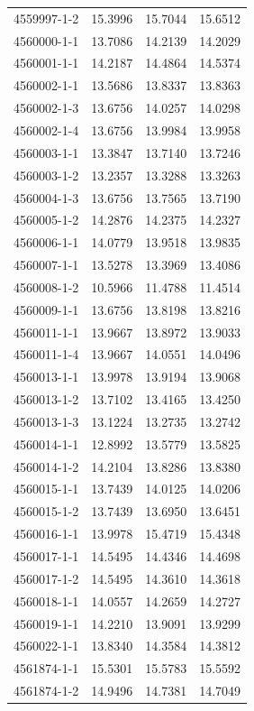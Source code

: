 \begin{longtable}{lrrr}
4559997-1-2 & 15.3996 & 15.7044 & 15.6512 \\
4560000-1-1 & 13.7086 & 14.2139 & 14.2029 \\
4560001-1-1 & 14.2187 & 14.4864 & 14.5374 \\
4560002-1-1 & 13.5686 & 13.8337 & 13.8363 \\
4560002-1-3 & 13.6756 & 14.0257 & 14.0298 \\
4560002-1-4 & 13.6756 & 13.9984 & 13.9958 \\
4560003-1-1 & 13.3847 & 13.7140 & 13.7246 \\
4560003-1-2 & 13.2357 & 13.3288 & 13.3263 \\
4560004-1-3 & 13.6756 & 13.7565 & 13.7190 \\
4560005-1-2 & 14.2876 & 14.2375 & 14.2327 \\
4560006-1-1 & 14.0779 & 13.9518 & 13.9835 \\
4560007-1-1 & 13.5278 & 13.3969 & 13.4086 \\
4560008-1-2 & 10.5966 & 11.4788 & 11.4514 \\
4560009-1-1 & 13.6756 & 13.8198 & 13.8216 \\
4560011-1-1 & 13.9667 & 13.8972 & 13.9033 \\
4560011-1-4 & 13.9667 & 14.0551 & 14.0496 \\
4560013-1-1 & 13.9978 & 13.9194 & 13.9068 \\
4560013-1-2 & 13.7102 & 13.4165 & 13.4250 \\
4560013-1-3 & 13.1224 & 13.2735 & 13.2742 \\
4560014-1-1 & 12.8992 & 13.5779 & 13.5825 \\
4560014-1-2 & 14.2104 & 13.8286 & 13.8380 \\
4560015-1-1 & 13.7439 & 14.0125 & 14.0206 \\
4560015-1-2 & 13.7439 & 13.6950 & 13.6451 \\
4560016-1-1 & 13.9978 & 15.4719 & 15.4348 \\
4560017-1-1 & 14.5495 & 14.4346 & 14.4698 \\
4560017-1-2 & 14.5495 & 14.3610 & 14.3618 \\
4560018-1-1 & 14.0557 & 14.2659 & 14.2727 \\
4560019-1-1 & 14.2210 & 13.9091 & 13.9299 \\
4560022-1-1 & 13.8340 & 14.3584 & 14.3812 \\
4561874-1-1 & 15.5301 & 15.5783 & 15.5592 \\
4561874-1-2 & 14.9496 & 14.7381 & 14.7049 \\

\end{longtable}
